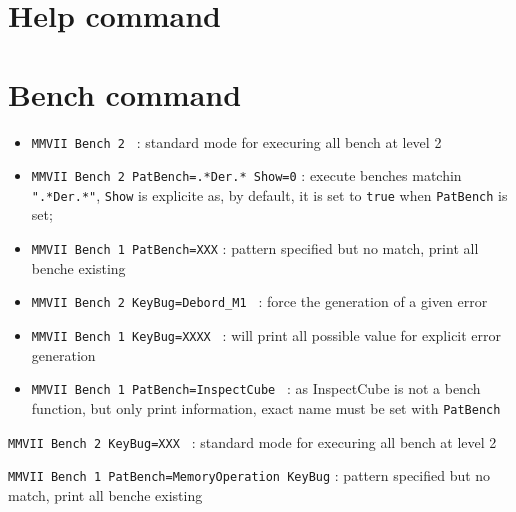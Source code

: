 

\section{Help command}

\label{HelpCmd}


\section{Bench command}


\begin{itemize}
    \item {\tt  MMVII Bench 2 }  : standard mode  for execuring all bench at level 2

    \item {\tt MMVII Bench 2 PatBench=.*Der.* Show=0}  : execute benches matchin {\tt ".*Der.*"},
          {\tt  Show} is explicite as, by default, it is set to {\tt  true} 
          when {\tt  PatBench} is set;
   
    \item {\tt MMVII Bench 1 PatBench=XXX} : pattern specified but no match, print all benche existing


    \item {\tt MMVII Bench 2 KeyBug=Debord\_M1 }  : force the generation of  a given error

    \item {\tt MMVII Bench 1 KeyBug=XXXX }  : will print all possible value for explicit error generation


    \item {\tt MMVII Bench 1 PatBench=InspectCube }  : as InspectCube is not a bench function, but 
         only print information, exact name must be set with {\tt PatBench}

\end{itemize}






{\tt MMVII Bench 2 KeyBug=XXX }  : standard mode  for execuring all bench at level 2

{\tt MMVII Bench 1 PatBench=MemoryOperation KeyBug} : pattern specified but no match, print all benche existing

